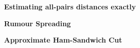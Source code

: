 \documentclass[a4paper]{article}
\begin{document}
\begin{question}
\textbf{Estimating all-pairs distances exactly}
\end{question}


\pagebreak

\begin{question}[]
\textbf{Rumour Spreading}
\end{question}


\pagebreak
\begin{question}[]
\textbf{Approximate Ham-Sandwich Cut}

\end{question}
\end{document}
